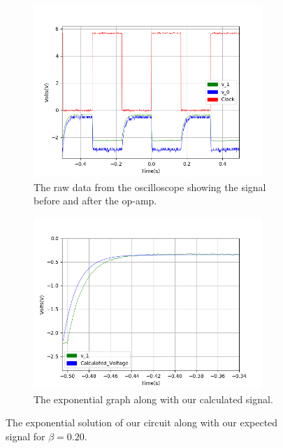\begin{figure}[h!]
\centering
\begin{subfigure}[t]{.475\textwidth}
  \centering
  \includegraphics[width=0.95\textwidth, height=0.22\textheight]{figures/Exponential/scope_27raw.png}
  \caption{The raw data from the oscilloscope showing the signal before and after the op-amp.}
 \label{fig:Exp_2_raw}
\end{subfigure}\hfill
\begin{subfigure}[t]{.475\textwidth}
  \centering
  \includegraphics[width=0.95\textwidth, height=0.22\textheight]{figures/Exponential/scope_27_calc.png}
  \caption{The exponential graph along with our calculated signal.}
\label{fig:Exp_2_calc}
\end{subfigure}
\caption{The exponential solution of our circuit along with our expected signal for $\beta = 0.20$.}
\label{fig:Exp_2}
\end{figure}


